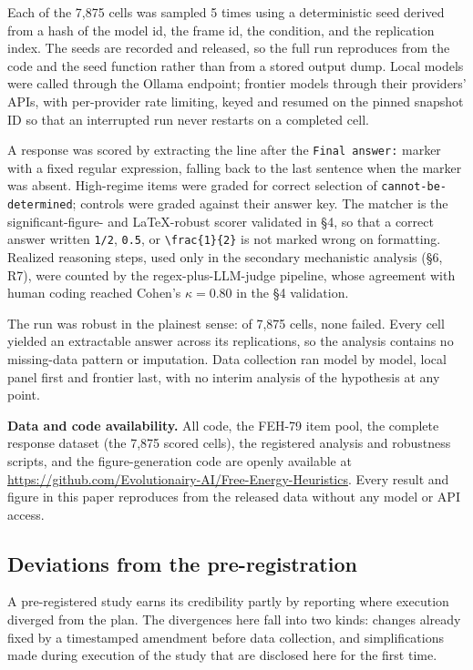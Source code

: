 \documentclass{article}
\begin{document}
Each of the 7,875 cells was sampled 5 times using a deterministic seed
derived from a hash of the model id, the frame id, the condition, and
the replication index. The seeds are recorded and released, so the full
run reproduces from the code and the seed function rather than from a
stored output dump. Local models were called through the Ollama
endpoint; frontier models through their providers' APIs, with
per-provider rate limiting, keyed and resumed on the pinned snapshot ID
so that an interrupted run never restarts on a completed cell.

A response was scored by extracting the line after the
\texttt{Final\ answer:} marker with a fixed regular expression, falling
back to the last sentence when the marker was absent. High-regime items
were graded for correct selection of \texttt{cannot-be-determined};
controls were graded against their answer key. The matcher is the
significant-figure- and LaTeX-robust scorer validated in \S{}4, so that a
correct answer written \texttt{1/2}, \texttt{0.5}, or
\texttt{\textbackslash{}frac\{1\}\{2\}} is not marked wrong on
formatting. Realized reasoning steps, used only in the secondary
mechanistic analysis (\S{}6, R7), were counted by the regex-plus-LLM-judge
pipeline, whose agreement with human coding reached Cohen's
\(\kappa = 0.80\) in the \S{}4 validation.

The run was robust in the plainest sense: of 7,875 cells, none failed.
Every cell yielded an extractable answer across its replications, so the
analysis contains no missing-data pattern or imputation. Data collection
ran model by model, local panel first and frontier last, with no interim
analysis of the hypothesis at any point.

\textbf{Data and code availability.} All code, the FEH-79 item pool, the
complete response dataset (the 7,875 scored cells), the registered
analysis and robustness scripts, and the figure-generation code are
openly available at
\url{https://github.com/Evolutionairy-AI/Free-Energy-Heuristics}. Every
result and figure in this paper reproduces from the released data
without any model or API access.

\subsection{Deviations from the
pre-registration}\label{deviations-from-the-pre-registration}

A pre-registered study earns its credibility partly by reporting where
execution diverged from the plan. The divergences here fall into two
kinds: changes already fixed by a timestamped amendment before data
collection, and simplifications made during execution of the study that
are disclosed here for the first time.
\end{document}
